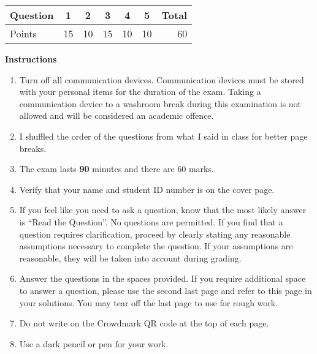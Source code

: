 \documentclass[12pt]{article}
\begin{document}
%
\begin{center}
 \begin{tabular}{|l| c c c c c  ||r|} \hline
 Question & 1 & 2 & 3 & 4 & 5 & Total \\ \hline
 Points & 15 & 10 & 15 & 10 & 10 & 60 \\ \hline
 \end{tabular}
\end{center}
%
\textbf{Instructions}
\begin{enumerate}
   \item Turn off all communication devices. Communication devices must be stored with your personal items for the duration of the exam. Taking a communication device to a washroom break during this examination is not allowed and will be considered an academic offence.
    \item I shuffled the order of the questions from what I said in class for better page breaks.
    \item The exam lasts \textbf{90} minutes and there are 60 marks.
    \item Verify that your name and student ID number is on the cover page.
    \item If you feel like you need to ask a question, know that the most likely answer is ``Read the Question''. No questions are permitted. If you find that a question requires clarification, proceed by clearly stating any reasonable assumptions necessary to complete the question. If your assumptions are reasonable, they will be taken into account during grading. 
\item Answer the questions in the spaces provided.  If you require 
additional space to answer a question, please use the second last page 
and refer to this page in your solutions. You may tear off the last page 
to use for rough work.
\item Do not write on the Crowdmark QR code at the top of each page.
\item Use a dark pencil or pen for your work.
\end{enumerate}
\end{document}
